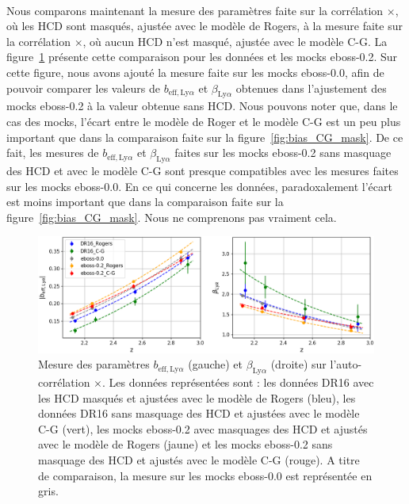 \documentclass[11pt, twoside, a4paper, openright]{report}
\begin{document}
\paragraph{}
Nous comparons maintenant la mesure des paramètres \lya{} faite sur la corrélation \lya{}$\times$\lya{}, où les HCD sont masqués, ajustée avec le modèle de Rogers, à la mesure faite sur la corrélation \lya{}$\times$\lya{}, où aucun HCD n'est masqué, ajustée avec le modèle C-G.
La figure~\ref{fig:bias_CG_no_mask} présente cette comparaison pour les données et les mocks eboss-0.2.
Sur cette figure, nous avons ajouté la mesure faite sur les mocks eboss-0.0, afin de pouvoir comparer les valeurs de $b_{\mathrm{eff},\mathrm{Ly}\alpha}$ et  $\beta_{\mathrm{Ly}\alpha}$ obtenues dans l'ajustement des mocks eboss-0.2 à la valeur obtenue sans HCD.
Nous pouvons noter que, dans le cas des mocks, l'écart entre le modèle de Roger et le modèle C-G est un peu plus important que dans la comparaison faite sur la figure~\ref{fig:bias_CG_mask}.
De ce fait, les mesures de $b_{\mathrm{eff},\mathrm{Ly}\alpha}$ et  $\beta_{\mathrm{Ly}\alpha}$ faites sur les mocks eboss-0.2 sans masquage des HCD et avec le modèle C-G sont presque compatibles avec les mesures faites sur les mocks eboss-0.0.
En ce qui concerne les données, paradoxalement l'écart est moins important que dans la comparaison faite sur la figure~\ref{fig:bias_CG_mask}. Nous ne comprenons pas vraiment cela.


\begin{figure}
  \centering
  \includegraphics[scale=0.45]{bias_CG_no_mask}
  \caption{Mesure des paramètres $b_{\mathrm{eff},\mathrm{Ly}\alpha}$ (gauche) et  $\beta_{\mathrm{Ly}\alpha}$ (droite) sur l'auto-corrélation \lya$\times$\lya{}.
    Les données représentées sont : les données DR16 avec les HCD masqués et ajustées avec le modèle de Rogers (bleu), les données DR16 sans masquage des HCD et ajustées avec le modèle C-G (vert), les mocks eboss-0.2 avec masquages des HCD et ajustés avec le modèle de Rogers (jaune) et les mocks eboss-0.2 sans masquage des HCD et ajustés avec le modèle C-G (rouge). A titre de comparaison, la mesure sur les mocks eboss-0.0 est représentée en gris.
  }
  \label{fig:bias_CG_no_mask}
\end{figure}
\end{document}
